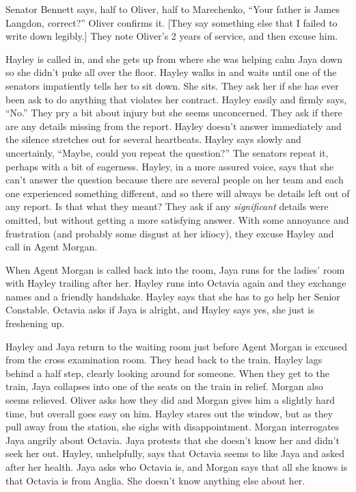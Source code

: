 Senator Bennett says, half to Oliver, half to Marechenko, ``Your father is James Langdon, correct?''  Oliver confirms it. {[}They say something else that I failed to write down legibly.{]}  They note Oliver's 2 years of service, and then excuse him.



Hayley is called in, and she gets up from where she was helping calm Jaya down so she didn't puke all over the floor.  Hayley walks in and waits until one of the senators impatiently tells her to sit down.  She sits.  They ask her if she has ever been ask to do anything that violates her contract.  Hayley easily and firmly says, ``No.''  They pry a bit about injury but she seems unconcerned.  They ask if there are any details missing from the report.  Hayley doesn't answer immediately and the silence stretches out for several heartbeats.  Hayley says slowly and uncertainly, ``Maybe, could you repeat the question?''  The senators repeat it, perhaps with a bit of eagerness.  Hayley, in a more assured voice, says that she can't answer the question because there are several people on her team and each one experienced something different, and so there will always be details left out of any report.  Is that what they meant?  They ask if any \textit{significant} details were omitted, but without getting a more satisfying answer.  With some annoyance and frustration (and probably some disgust at her idiocy), they excuse Hayley and call in Agent Morgan.



When Agent Morgan is called back into the room, Jaya runs for the ladies' room with Hayley trailing after her.  Hayley runs into Octavia again and they exchange names and a friendly handshake.  Hayley says that she has to go help her Senior Constable.  Octavia asks if Jaya is alright, and Hayley says yes, she just is freshening up.



Hayley and Jaya return to the waiting room just before Agent Morgan is excused from the cross examination room.  They head back to the train.  Hayley lags behind a half step, clearly looking around for someone.  When they get to the train, Jaya collapses into one of the seats on the train in relief.  Morgan also seems relieved.  Oliver asks how they did and Morgan gives him a slightly hard time, but overall goes easy on him.  Hayley stares out the window, but as they pull away from the station, she sighs with disappointment.  Morgan interrogates Jaya angrily about Octavia.  Jaya protests that she doesn't know her and didn't seek her out.  Hayley, unhelpfully, says that Octavia seems to like Jaya and asked after her health.  Jaya asks who Octavia is, and Morgan says that all she knows is that Octavia is from Anglia.  She doesn't know anything else about her.  



